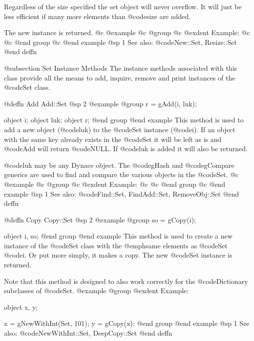 Regardless of the size specified the set object will never overflow.
It will just be less efficient if many more elements than @code{size}
are added.

The new instance is returned.
@c @example
@c @group
@c @exdent Example:
@c 
@c @end group
@c @end example
@sp 1
See also:  @code{New::Set, Resize::Set}
@end deffn





@subsection Set Instance Methods
The instance methods associated with this class provide all the means
to add, inquire, remove and print instances of the @code{Set} class.












@deffn {Add} Add::Set
@sp 2
@example
@group
r = gAdd(i, luk);

object  i;
object  luk;
object  r;
@end group
@end example
This method is used to add a new object (@code{luk}) to the @code{Set} instance
(@code{i}).  If an object with the same key already exists in the @code{Set} it
will be left as is and @code{Add} will return @code{NULL}.  If
@code{luk} is added it will also be returned.

@code{luk} may be any Dynace object.  The @code{gHash} and
@code{gCompare} generics are used to find and compare the various
objects in the @code{Set}.
@c @example
@c @group
@c @exdent Example:
@c 
@c @end group
@c @end example
@sp 1
See also:  @code{Find::Set, FindAdd::Set, RemoveObj::Set}
@end deffn











@deffn {Copy} Copy::Set
@sp 2
@example
@group
so = gCopy(i);

object  i, so;
@end group
@end example
This method is used to create a new instance of the @code{Set} class
with the @emph{same} elements as @code{Set} @code{i}.  Or put more simply,
it makes a copy.  The new @code{Set} instance is returned.

Note that this method is designed to also work correctly for the
@code{Dictionary} subclasses of @code{Set}.
@example
@group
@exdent Example:

object  x, y;

x = gNewWithInt(Set, 101);
y = gCopy(x);
@end group
@end example
@sp 1
See also:  @code{NewWithInt::Set, DeepCopy::Set}
@end deffn













